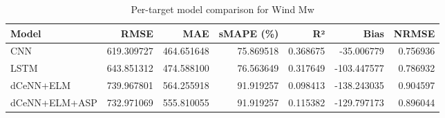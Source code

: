 \begin{table}
\caption{Per-target model comparison for Wind Mw}
\begin{tabular}{lrrrrrr}
\toprule
Model & RMSE & MAE & sMAPE (\%) & R² & Bias & NRMSE \\
\midrule
CNN & 619.309727 & 464.651648 & 75.869518 & 0.368675 & -35.006779 & 0.756936 \\
LSTM & 643.851312 & 474.588100 & 76.563649 & 0.317649 & -103.447577 & 0.786932 \\
dCeNN+ELM & 739.967801 & 564.255918 & 91.919257 & 0.098413 & -138.243035 & 0.904597 \\
dCeNN+ELM+ASP & 732.971069 & 555.810055 & 91.919257 & 0.115382 & -129.797173 & 0.896044 \\
\bottomrule
\end{tabular}
\end{table}
